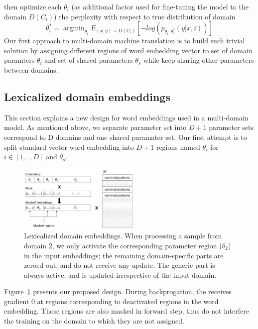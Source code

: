 \documentclass[11pt,a4paper]{article}
\DeclareMathOperator*{\argmin}{argmin}
\newcommand{\fyTodo}[1]{\Todo[FY:]{\textcolor{orange}{#1}}}
\begin{document}
then optimize each $\theta_i$ (as additional factor used for fine-tuning the model to the domain $D(C_{i})$) the perplexity with respect to true distribution of domain
\begin{equation}
\theta^*_{i} = \displaystyle{\mathop{\argmin}_{\theta_i}}E_{(x,y) \sim D(C_{i})}[-log(p_{\theta_i,\theta^*_s}(y|x,i))]
\end{equation} 
Our first approach to multi-domain machine translation is to build such trivial solution by assigning different regions of word embedding vector to set of domain paramters $\theta_i$ and set of shared parameters $\theta_s$ while keep sharing other parameters between domains.

\subsection{Lexicalized domain embeddings \label{ssec:lde}}

This section explains a new design for word embeddings used in a multi-domain model. As mentioned above, we separate parameter set into $D+1$ parameter sets correspond to D domains and one shared paramater set. Our first attempt is to split standard vector word embedding into $D+1$ regions named $\theta_i$ for $i \in [1,..,D]$ and $\theta_s$.\fyTodo{nullified not vanishing}
\begin{figure}
\center
    \includegraphics[width=0.52\textwidth]{embeddings}
    \caption{Lexicalized domain embeddings. When processing a sample from domain $2$, we only activate the corresponding parameter region ($\theta_2$) in the input embeddings; the remaining domain-specific parts are zeroed out, and do not receive any update. The generic part is always active, and is updated irrespective of the input domain.} 
    \label{fig:network}
  \end{figure}
\fyTodo{Explain vanishing ?}
Figure~\ref{fig:network} presents our proposed design. During backprogation, the \fyTodo{fix notation}{projection matrix $M$} receives gradient 0 at regions corresponding to deactivated regions in the word embedding. Those regions are also masked in forward step, thus do not interfere the training on the domain to which they are not assigned.
\end{document}
